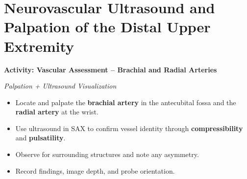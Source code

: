 \section*{Neurovascular Ultrasound and Palpation of the Distal Upper Extremity}

\begin{labactivitybox}
\textbf{Activity: Vascular Assessment – Brachial and Radial Arteries}

\textit{Palpation + Ultrasound Visualization}
\begin{itemize}
  \item Locate and palpate the \textbf{brachial artery} in the antecubital fossa and the \textbf{radial artery} at the wrist.
  \item Use ultrasound in SAX to confirm vessel identity through \textbf{compressibility} and \textbf{pulsatility}.
  \item Observe for surrounding structures and note any asymmetry.
  \item Record findings, image depth, and probe orientation.
\end{itemize}
\end{labactivitybox}

